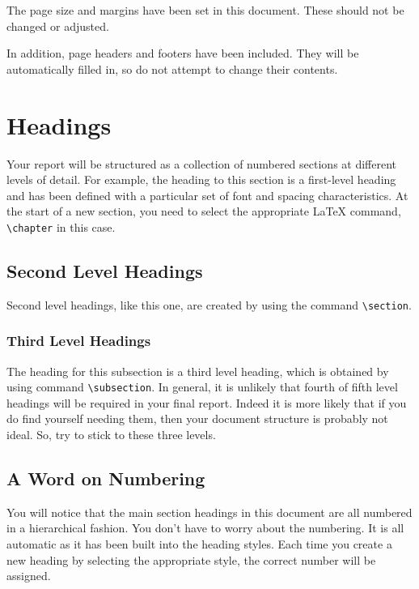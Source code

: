 \documentclass[]{final_report}
\begin{document}
The page size and margins have been set in this document. These should not be changed or adjusted. 

In addition, page headers and footers have been included. They will be automatically filled in, so do not attempt to change their contents.

\chapter{Headings}

Your report will be structured as a collection of numbered sections at different levels of detail. For example, the heading to this section is a first-level heading and has been defined with a particular set of font and spacing characteristics. At the start of a new section, you need to select the appropriate \LaTeX{} command, \verb|\chapter| in this case.
\section{Second Level Headings}
Second level headings, like this one, are created by using the command \verb|\section|.
\subsection{Third Level Headings}
The heading for this subsection is a third level heading, which is obtained by using command \verb|\subsection|. In general, it is unlikely that fourth of fifth level headings will be required in your final report. Indeed it is more likely that if you do find yourself needing them, then your document structure is probably not ideal. So, try to stick to these three levels.
\section{A Word on Numbering}
You will notice that the main section headings in this document are all numbered in a hierarchical fashion. You don't have to worry about the numbering. It is all automatic as it has been built into the heading styles. Each time you create a new heading by selecting the appropriate style, the correct number will be assigned. 
\end{document}
